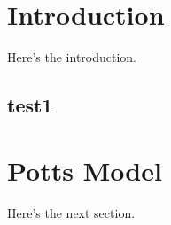 \documentclass[aps,prl,preprint]{revtex4-1}
\begin{document}

\section{Introduction}
Here's the introduction.
\subsection{test1}

\section{Potts Model}
Here's the next section.


%

\end{document}

